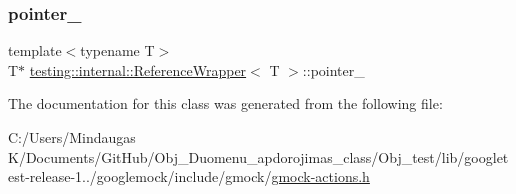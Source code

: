 \subsubsection{\texorpdfstring{pointer\_}{pointer\_}}
{\footnotesize\ttfamily template$<$typename T$>$ \\
T$\ast$ \mbox{\hyperlink{classtesting_1_1internal_1_1_reference_wrapper}{testing\+::internal\+::\+Reference\+Wrapper}}$<$ T $>$\+::pointer\+\_\+\hspace{0.3cm}{\ttfamily [private]}}



The documentation for this class was generated from the following file\+:\begin{DoxyCompactItemize}
\item 
C\+:/\+Users/\+Mindaugas K/\+Documents/\+Git\+Hub/\+Obj\+\_\+\+Duomenu\+\_\+apdorojimas\+\_\+class/\+Obj\+\_\+test/lib/googletest-\/release-\/1../googlemock/include/gmock/\mbox{\hyperlink{_obj__test_2lib_2googletest-release-1_88_81_2googlemock_2include_2gmock_2gmock-actions_8h}{gmock-\/actions.\+h}}\end{DoxyCompactItemize}
